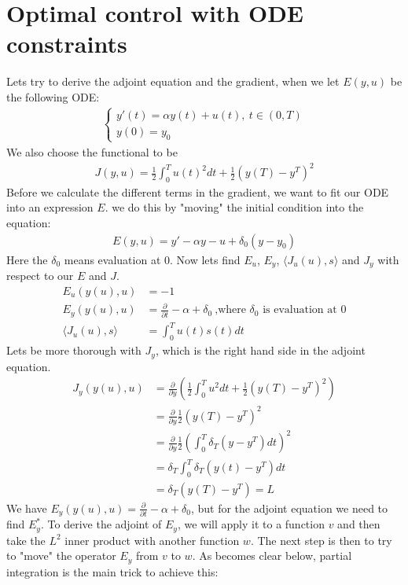 \documentclass[11pt,a4paper]{article}
\begin{document}
\section{Optimal control with ODE constraints}
Lets try to derive the adjoint equation and the gradient, when we let $E(y,u)$ be the following ODE:
\begin{align*}
\left\{
     \begin{array}{lr}
       	y'(t)=\alpha y(t) +u(t), \ t \in (0,T)\\
       	   y(0)=y_0
     \end{array}
   \right.
\end{align*}
We also choose the functional to be
\begin{align*}
J(y,u) = \frac{1}{2}\int_0^Tu(t)^2dt + \frac{1}{2}(y(T)-y^T)^2
\end{align*}
Before we calculate the different terms in the gradient, we want to fit our ODE into an expression $E$. we do this by "moving" the initial condition into the equation:
\begin{align*}
E(y,u) = y'-\alpha y - u + \delta_0(y-y_0)
\end{align*}
Here the $\delta_0$ means evaluation at $0$. Now  lets find $E_u$, $E_y$, $ \langle J_u(u),s\rangle$ and $J_y$ with respect to our $E$ and $J$.
\begin{align*}
E_u(y(u),u)&=-1 \\
E_y(y(u),u)&=\frac{\partial}{\partial t} - \alpha + \delta_0 \ \text{,where $\delta_0$ is evaluation at 0} \\
\langle J_u(u),s\rangle &= \int_0^T u(t)s(t) dt 
\end{align*}
Lets be more thorough with $J_y$, which is the right hand side in the adjoint equation.
\begin{align*}
J_y(y(u),u) &= \frac{\partial}{\partial y}(\frac{1}{2}\int_0^Tu^2dt + \frac{1}{2}(y(T)-y^T)^2) \\ &= \frac{\partial}{\partial y} \frac{1}{2}(y(T)-y^T)^2 \\
&= \frac{\partial}{\partial y}\frac{1}{2}(\int_0^T \delta_T(y-y^T)dt)^2 \\
&= \delta_T\int_0^T \delta_T(y(t)-y^T)dt \\
&= \delta_T(y(T)-y^T)=L
\end{align*}
We have $E_y(y(u),u)=\frac{\partial}{\partial t} - \alpha + \delta_0$, but for the adjoint equation we need to find $E_y^*$.
To derive the adjoint of $E_y$, we will apply it to a function $v$ and then take the $L^2$ inner product with another function $w$. The next step is then to try to "move" the operator $E_y$ from $v$ to $w$. As becomes clear below, partial integration is the main trick to achieve this: 
\end{document}

